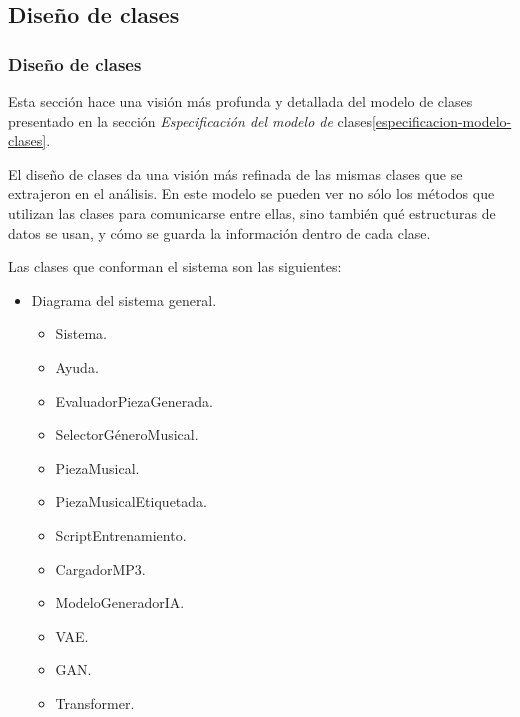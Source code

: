 
\subsection{Diseño de clases}
\label{diseño-clases}
\subsubsection{Diseño de clases}

Esta sección hace una visión más profunda y detallada del modelo de clases presentado en la sección \emph{Especificación del modelo de }clases\ref{especificacion-modelo-clases}.

El diseño de clases da una visión más refinada de las mismas clases que se extrajeron en el análisis. En este modelo se pueden ver no sólo los métodos que utilizan las clases para comunicarse entre ellas, sino también qué estructuras de datos se usan, y cómo se guarda la información dentro de cada clase.

Las clases que conforman el sistema son las siguientes:

\begin{itemize}
    \item Diagrama del sistema general.
    \begin{itemize}
        \item Sistema.
        \item Ayuda.
        \item EvaluadorPiezaGenerada.
        \item SelectorGéneroMusical.
        \item PiezaMusical.
        \item PiezaMusicalEtiquetada.
        \item ScriptEntrenamiento.
        \item CargadorMP3.
        \item ModeloGeneradorIA.
        \item VAE.
        \item GAN.
        \item Transformer.
    \end{itemize}
\end{itemize}

